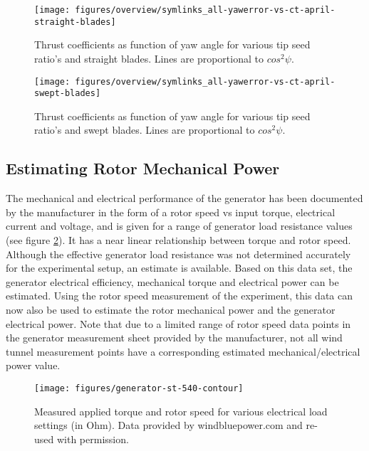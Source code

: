 \documentclass[a4paper]{jpconf}
\begin{document}
\begin{figure}[h]
\begin{minipage}{17pc}
\texttt{[image: figures/overview/symlinks\_all-yawerror-vs-ct-april-straight-blades]}
\caption{\label{ct-vs-yawerror-straight} Thrust coefficients as function of yaw angle for various tip seed ratio's and straight blades. Lines are proportional to $cos^2 \psi$.}
\end{minipage}\hspace{3pc}%
\begin{minipage}{17pc}
\texttt{[image: figures/overview/symlinks\_all-yawerror-vs-ct-april-swept-blades]}
\caption{\label{ct-vs-yawerror-swept} Thrust coefficients as function of yaw angle for various tip seed ratio's and swept blades. Lines are proportional to $cos^2 \psi$.}
\end{minipage} 
\end{figure}


\subsection{Estimating Rotor Mechanical Power}

The mechanical and electrical performance of the generator has been documented by the manufacturer in the form of a rotor speed vs input torque, electrical current and voltage, and is given for a range of generator load resistance values (see figure \ref{rpm2torque-windbluepower}). It has a near linear relationship between torque and rotor speed. Although the effective generator load resistance was not determined accurately for the experimental setup, an estimate is available. Based on this data set, the generator electrical efficiency, mechanical torque and electrical power can be estimated. Using the rotor speed measurement of the experiment, this data can now also be used to estimate the rotor mechanical power and the generator electrical power. Note that due to a limited range of rotor speed data points in the generator measurement sheet provided by the manufacturer, not all wind tunnel measurement points have a corresponding estimated mechanical/electrical power value.

\begin{figure}[h]
\centering
\begin{minipage}{\textwidth}
\centering
\texttt{[image: figures/generator-st-540-contour]}
\caption{\label{rpm2torque-windbluepower} Measured applied torque and rotor speed for various electrical load settings (in Ohm). Data provided by windbluepower.com and re-used with permission.}
\end{minipage} 
\end{figure}
\end{document}
